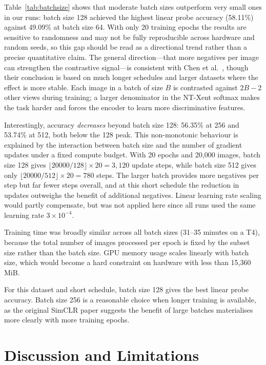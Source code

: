 \documentclass[twoside,a4paper,11pt]{article}
\begin{document}
Table~\ref{tab:batchsize} shows that moderate batch sizes outperform very small ones
in our runs: batch size 128 achieved the highest linear probe accuracy (58.11\%)
against 49.09\% at batch size 64. With only 20 training epochs the results are
sensitive to randomness and may not be fully reproducible across hardware and random
seeds, so this gap should be read as a directional trend rather than a precise
quantitative claim. The general direction---that more negatives per image can
strengthen the contrastive signal---is consistent with Chen et al.\
\cite{chen2020simclr}, though their conclusion is based on much longer schedules and
larger datasets where the effect is more stable. Each image in a batch of size $B$ is contrasted
against $2B - 2$ other views during training; a larger denominator in the NT-Xent
softmax makes the task harder and forces the encoder to learn more discriminative
features.

Interestingly, accuracy \textit{decreases} beyond batch size 128: 56.35\% at 256 and
53.74\% at 512, both below the 128 peak. This non-monotonic behaviour is explained by
the interaction between batch size and the number of gradient updates under a fixed
compute budget. With 20 epochs and 20,000 images, batch size 128 gives
$\lfloor 20000/128 \rfloor \times 20 = 3{,}120$ update steps, while batch size 512
gives only $\lfloor 20000/512 \rfloor \times 20 = 780$ steps. The larger batch
provides more negatives per step but far fewer steps overall, and at this short
schedule the reduction in updates outweighs the benefit of additional negatives.
Linear learning rate scaling \cite{goyal2017scaling} would partly compensate, but
was not applied here since all runs used the same learning rate $3\times10^{-4}$.

Training time was broadly similar across all batch sizes (31--35 minutes on a T4),
because the total number of images processed per epoch is fixed by the subset size
rather than the batch size. GPU memory usage scales linearly with batch size, which
would become a hard constraint on hardware with less than 15,360\,MiB.

For this dataset and short schedule, batch size 128 gives the best linear probe
accuracy. Batch size 256 is a reasonable choice when longer training is available,
as the original SimCLR paper suggests the benefit of large batches materialises more
clearly with more training epochs.

\section{Discussion and Limitations}
\label{sec:discussion}
\end{document}
